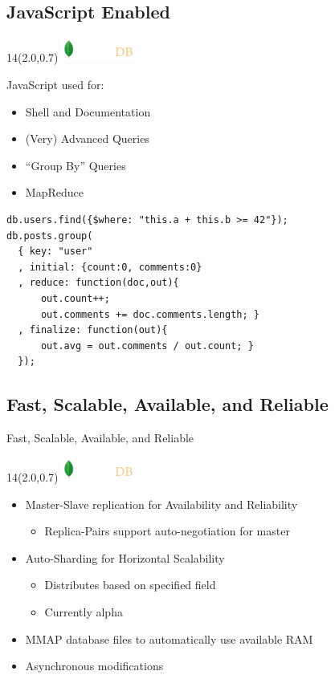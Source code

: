 \documentclass{beamer}
\newcommand{\MongoLogo}{
\begin{textblock}{14}(2.0,0.7)
  \includegraphics[height=0.8cm]{logo-mongodb-ondark.png}
\end{textblock}
}
\begin{document}
\subsection{JavaScript Enabled}
\begin{frame}[fragile]
  \MongoLogo
  JavaScript used for:
  \begin{itemize}
    \item Shell and Documentation
    \item (Very) Advanced Queries
    \item ``Group By'' Queries
    \item MapReduce
  \end{itemize}

  \begin{verbatim}
db.users.find({$where: "this.a + this.b >= 42"});
db.posts.group(
  { key: "user"
  , initial: {count:0, comments:0}
  , reduce: function(doc,out){
      out.count++;
      out.comments += doc.comments.length; }
  , finalize: function(out){ 
      out.avg = out.comments / out.count; }
  });
  \end{verbatim}
\end{frame}

\subsection{Fast, Scalable, Available, and Reliable}
\begin{frame}{Fast, Scalable, Available, and Reliable}
  \MongoLogo
  \begin{itemize}
  \item Master-Slave replication for Availability and Reliability
    \begin{itemize}
      \item Replica-Pairs support auto-negotiation for master
    \end{itemize}
  \item Auto-Sharding for Horizontal Scalability
    \begin{itemize}
      \item Distributes based on specified field
      \item Currently alpha
    \end{itemize}
  \item MMAP database files to automatically use available RAM
  \item Asynchronous modifications
  \end{itemize}
\end{frame}
\end{document}
